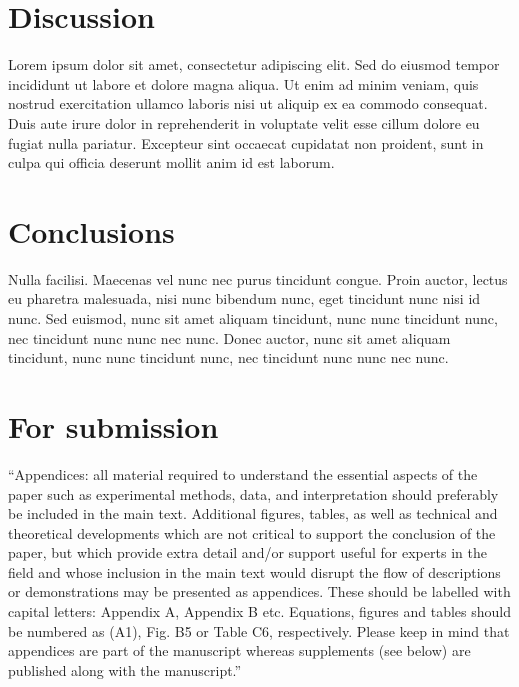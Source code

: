 \documentclass[soil, manuscript]{copernicus}
\begin{document}
\section{Discussion}

Lorem ipsum dolor sit amet, consectetur adipiscing elit.
Sed do eiusmod tempor incididunt ut labore et dolore magna aliqua.
Ut enim ad minim veniam, quis nostrud exercitation ullamco laboris nisi ut aliquip ex ea commodo consequat.
Duis aute irure dolor in reprehenderit in voluptate velit esse cillum dolore eu fugiat nulla pariatur.
Excepteur sint occaecat cupidatat non proident,
sunt in culpa qui officia deserunt mollit anim id est laborum.

\section{Conclusions}

Nulla facilisi.
Maecenas vel nunc nec purus tincidunt congue.
Proin auctor, lectus eu pharetra malesuada,
nisi nunc bibendum nunc,
eget tincidunt nunc nisi id nunc.
Sed euismod, nunc sit amet aliquam tincidunt,
nunc nunc tincidunt nunc,
nec tincidunt nunc nunc nec nunc.
Donec auctor, nunc sit amet aliquam tincidunt,
nunc nunc tincidunt nunc,
nec tincidunt nunc nunc nec nunc.







\appendix
\section{For submission}

``Appendices: all material required to understand the essential aspects of the paper
such as experimental methods, data, and interpretation
should preferably be included in the main text.
Additional figures, tables, as well as technical and theoretical developments
which are not critical to support the conclusion of the paper,
but which provide extra detail and/or support useful for experts in the field
and whose inclusion in the main text would disrupt the flow of descriptions or demonstrations
may be presented as appendices.
These should be labelled with capital letters: Appendix A, Appendix B etc.
Equations, figures and tables should be numbered as (A1), Fig. B5 or Table C6, respectively.
Please keep in mind that appendices are part of the manuscript
whereas supplements (see below) are published along with the manuscript.''
\end{document}
